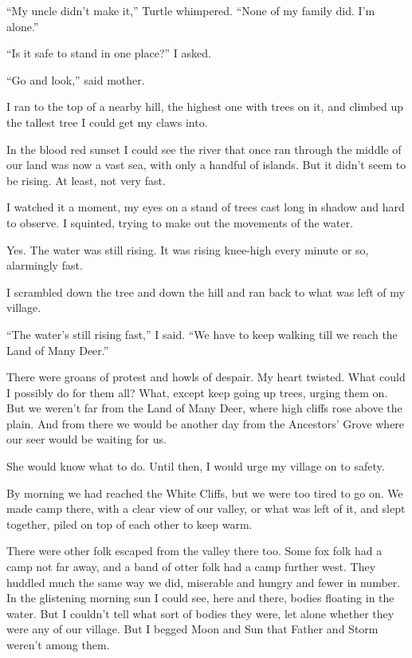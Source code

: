 ``My uncle didn't make it,'' Turtle whimpered. ``None of my family did. I'm alone.''

``Is it safe to stand in one place?'' I asked.

``Go and look,'' said mother.

I ran to the top of a nearby hill, the highest one with trees on it, and climbed up the tallest tree I could get my claws into.

In the blood red sunset I could see the river that once ran through the middle of our land was now a vast sea, with only a handful of islands. But it didn't seem to be rising. At least, not very fast.

I watched it a moment, my eyes on a stand of trees cast long in shadow and hard to observe. I squinted, trying to make out the movements of the water.

Yes. The water was still rising. It was rising knee-high every minute or so, alarmingly fast.

I scrambled down the tree and down the hill and ran back to what was left of my village.

``The water's still rising fast,'' I said. ``We have to keep walking till we reach the Land of Many Deer.''

There were groans of protest and howls of despair. My heart twisted. What could I possibly do for them all? What, except keep going up trees, urging them on. But we weren't far from the Land of Many Deer, where high cliffs rose above the plain. And from there we would be another day from the Ancestors' Grove where our seer would be waiting for us.

She would know what to do. Until then, I would urge my village on to safety.

\secdiv

By morning we had reached the White Cliffs, but we were too tired to go on. We made camp there, with a clear view of our valley, or what was left of it, and slept together, piled on top of each other to keep warm.

There were other folk escaped from the valley there too. Some fox folk had a camp not far away, and a band of otter folk had a camp further west. They huddled much the same way we did, miserable and hungry and fewer in number. In the glistening morning sun I could see, here and there, bodies floating in the water. But I couldn't tell what sort of bodies they were, let alone whether they were any of our village. But I begged Moon and Sun that Father and Storm weren't among them.

